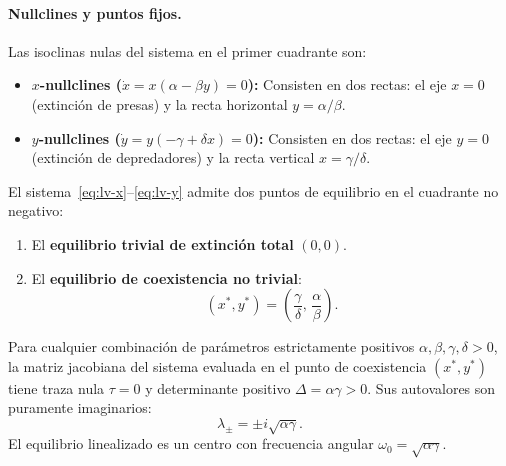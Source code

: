\paragraph{Nullclines y puntos fijos.}
Las isoclinas nulas del sistema en el primer cuadrante son:
\begin{itemize}
    \item \textbf{$x$-nullclines ($\dot{x} = x(\alpha - \beta y) = 0$):} Consisten en dos rectas: el eje $x = 0$ (extinción de presas) y la recta horizontal $y = \alpha/\beta$.
    \item \textbf{$y$-nullclines ($\dot{y} = y(-\gamma + \delta x) = 0$):} Consisten en dos rectas: el eje $y = 0$ (extinción de depredadores) y la recta vertical $x = \gamma/\delta$.
\end{itemize}

\begin{definition}
El sistema~\eqref{eq:lv-x}--\eqref{eq:lv-y} admite dos puntos de equilibrio en el cuadrante no negativo:
\begin{enumerate}
    \item El \textbf{equilibrio trivial de extinción total} $(0,0)$.
    \item El \textbf{equilibrio de coexistencia no trivial}:
    \begin{equation}
        (x^{*}, y^{*}) = \left(\frac{\gamma}{\delta},\, \frac{\alpha}{\beta}\right).
        \label{eq:lv_coexistencia}
    \end{equation}
\end{enumerate}
\end{definition}

\begin{theorem}
\label{thm:lv_estabilidad}
Para cualquier combinación de parámetros estrictamente positivos $\alpha, \beta, \gamma, \delta > 0$, la matriz jacobiana del sistema evaluada en el punto de coexistencia $(x^{*}, y^{*})$ tiene traza nula $\tau = 0$ y determinante positivo $\Delta = \alpha\gamma > 0$. Sus autovalores son puramente imaginarios:
\begin{equation}
    \lambda_{\pm} = \pm i \sqrt{\alpha \gamma}.
\end{equation}
El equilibrio linealizado es un centro con frecuencia angular $\omega_0 = \sqrt{\alpha\gamma}$.
\end{theorem}

